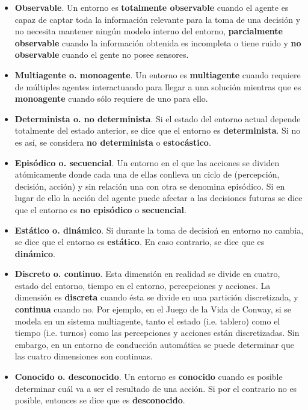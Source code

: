 \begin{itemize}
	\item \textbf{Observable}. Un entorno es \textbf{totalmente observable} cuando el agente es capaz de captar toda la información relevante para la toma de una decisión y no necesita mantener ningún modelo interno del entorno, \textbf{parcialmente observable} cuando la información obtenida es incompleta o tiene ruido y \textbf{no observable} cuando el gente no posee sensores.
	\item \textbf{Multiagente o. monoagente}. Un entorno es \textbf{multiagente} cuando requiere de múltiples agentes interactuando para llegar a una solución mientras que es \textbf{monoagente} cuando sólo requiere de uno para ello.
	\item \textbf{Determinista o. no determinista}. Si el estado del entorno actual depende totalmente del estado anterior, se dice que el entorno es \textbf{determinista}. Si no es así, se considera \textbf{no determinista} o \textbf{estocástico}.
	\item \textbf{Episódico o. secuencial}. Un entorno en el que las acciones se dividen atómicamente donde cada una de ellas conlleva un ciclo de (percepción, decisión, acción) y sin relación una con otra se denomina episódico. Si en lugar de ello la acción del agente puede afectar a las decisiones futuras se dice que el entorno es \textbf{no episódico} o \textbf{secuencial}.
	\item \textbf{Estático o. dinámico}. Si durante la toma de decisioń en entorno no cambia, se dice que el entorno es \textbf{estático}. En caso contrario, se dice que es \textbf{dinámico}.
	\item \textbf{Discreto o. continuo}. Esta dimensión en realidad se divide en cuatro, estado del entorno, tiempo en el entorno, percepciones y acciones. La dimensión es \textbf{discreta} cuando ésta se divide en una partición discretizada, y \textbf{continua} cuando no. Por ejemplo, en el Juego de la Vida de Conway, si se modela en un sistema multiagente, tanto el estado (i.e. tablero) como el tiempo (i.e. turnos) como las percepciones y acciones están discretizadas. Sin embargo, en un entorno de conducción automática se puede determinar que las cuatro dimensiones son continuas.
	\item \textbf{Conocido o. desconocido}. Un entorno es \textbf{conocido} cuando es posible determinar cuál va a ser el resultado de una acción. Si por el contrario no es posible, entonces se dice que es \textbf{desconocido}.
\end{itemize}


